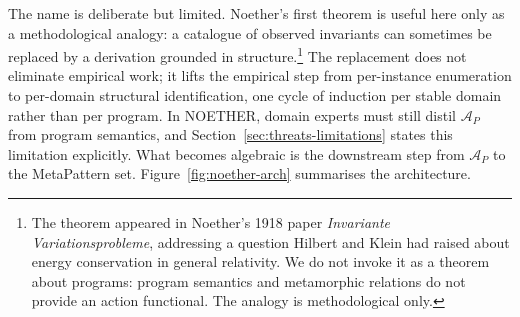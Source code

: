 \documentclass[acmsmall,screen,review]{acmart}
\begin{document}
The name is deliberate but limited. Noether's first theorem is useful here only as a methodological analogy: a catalogue of observed invariants can sometimes be replaced by a derivation grounded in structure.\footnote{The theorem appeared in Noether's 1918 paper \emph{Invariante Variationsprobleme}, addressing a question Hilbert and Klein had raised about energy conservation in general relativity. We do not invoke it as a theorem about programs: program semantics and metamorphic relations do not provide an action functional. The analogy is methodological only.} The replacement does not eliminate empirical work; it lifts the empirical step from per-instance enumeration to per-domain structural identification, one cycle of induction per stable domain rather than per program. In NOETHER, domain experts must still distil $\mathcal{A}_P$ from program semantics, and Section~\ref{sec:threats-limitations} states this limitation explicitly. What becomes algebraic is the downstream step from $\mathcal{A}_P$ to the MetaPattern set. Figure~\ref{fig:noether-arch} summarises the architecture.
\end{document}
